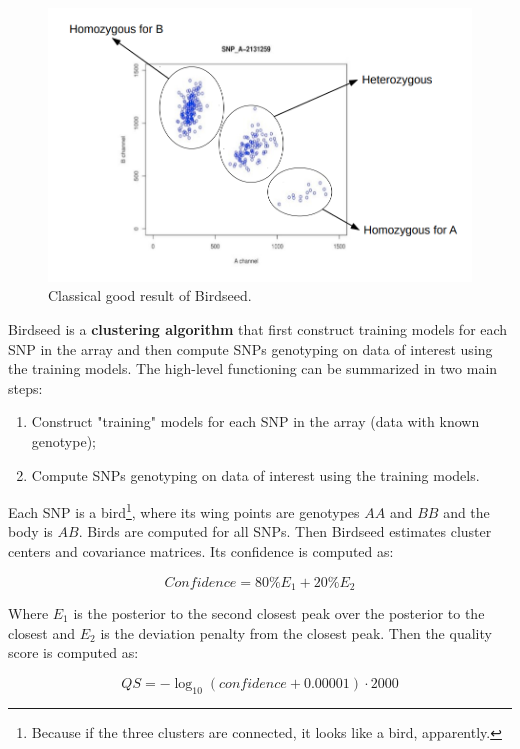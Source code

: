 			
			\begin{figure}[H]
				\centering
				\includegraphics[scale=0.3]{birdseed}
				\caption{Classical good result of Birdseed. }
				\label{fig:birdseed}
				\end{figure}
			
			
			Birdseed is a \textbf{clustering algorithm} that first construct training models for each SNP in the array and then compute SNPs genotyping on data of interest using the training models.
			The high-level functioning can be summarized in two main steps:
			\begin{enumerate}
			\item Construct "training" models for each SNP in the array (data with known genotype);
			\item Compute SNPs genotyping on data of interest using the training models. 
			\end{enumerate}
			
			Each SNP is a bird\footnote{Because if the three clusters are connected, it looks like a bird, apparently.}, where its wing points are genotypes $AA$ and $BB$ and the body is $AB$.
			Birds are computed for all SNPs.
			Then Birdseed estimates cluster centers and covariance matrices.
			Its confidence is computed as:

			$$Confidence = 80\% E_1 + 20\% E_2$$

			Where $E_1$ is the posterior to the second closest peak over the posterior to the closest and $E_2$ is the deviation penalty from the closest peak.
			Then the quality score is computed as:

			$$QS = -\log_{10}(confidence + 0.00001)\cdot 2000$$
			
